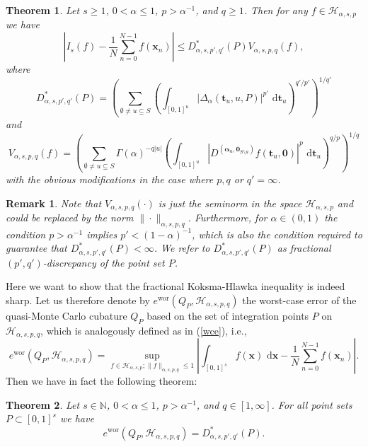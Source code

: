 \documentclass[12pt]{article}
\DeclareMathOperator{\wor}{wor}
\newtheorem{theorem}{Theorem}
\newtheorem{remark}{Remark}
\newcommand{\bsx}{\boldsymbol{x}}
\newcommand{\bst}{\boldsymbol{t}}
\newcommand{\bsalpha}{\boldsymbol{\alpha}}
\newcommand{\bszero}{\boldsymbol{0}}
\newcommand{\rd}{\,\mathrm{d}}
\newcommand{\NN}{\mathbb{N}}
\newcommand{\HH}{\mathcal{H}}
\begin{document}
\begin{theorem}\label{th_fracKH}
Let $s \ge 1$, $0 < \alpha \le 1$, $p > \alpha^{-1}$, and $q \ge 1$.
Then for any $f \in
\HH_{\alpha,s,p}$ we have
\begin{equation*}%
\left|I_s(f) - \frac{1}{N}
\sum_{n=0}^{N-1} f(\bsx_n) \right|  \le  D^\ast_{\alpha,s,p',q'}(P)
V_{\alpha,s,p,q}(f),
\end{equation*}
where
\begin{equation*}
D^\ast_{\alpha,s,p',q'}(P) = \left(\sum_{\emptyset \neq u \subseteq S}
 \left(\int_{[0,1]^{u}}
|\Delta_\alpha(\bst_u,u,P)|^{p'} \,\rd\bst_u \right)^{q'/p'}
\right)^{1/q'}
\end{equation*}
and
\begin{equation*}
V_{\alpha,s,p,q}(f) =\left(\sum_{\emptyset \neq u \subseteq S} 
\Gamma(\alpha)^{-q|u|}
\left(\int_{[0,1]^{u}} \left| D^{(\bsalpha_u, \bszero_{S\setminus u})}f(\bst_u, \bszero)\right|^{p} \,\rd\bst_u
\right)^{q/p} \right)^{1/q}
\end{equation*}
with the obvious modifications in the case where $p,q$ or $q'=\infty$.
\end{theorem}


\begin{remark}
Note that
$V_{\alpha,s,p,q}(\cdot)$ is just the seminorm in the space
$\HH_{\alpha,s,p}$ and could be replaced by the norm
$\|\cdot\|_{\alpha,s,p,q}$.
Furthermore, for $\alpha\in (0,1)$ the condition $p > \alpha^{-1}$ implies $p' < (1-\alpha)^{-1}$, which
is also the condition required to guarantee that
$D^\ast_{\alpha,s,p',q'}(P) < \infty$. 
We refer to $D^\ast_{\alpha,s,p',q'}(P)$ as \emph{fractional $(p', q')$-discrepancy} 
of the point set $P$.
\end{remark}


Here we want to show that the fractional Koksma-Hlawka inequality is indeed
sharp. Let us therefore denote by $e^{\wor}(Q_P,\HH_{\alpha,s,p,q})$ the
worst-case error
of the quasi-Monte Carlo cubature $Q_P$ based on the set of
integration points $P$ on $\HH_{\alpha,s,p,q}$, which is analogously defined as in (\ref{wce}), i.e.,
\begin{equation*}
e^{\wor}(Q_P,\HH_{\alpha,s,p,q}) = \sup_{f\in \HH_{\alpha,s,p}; \|f\|_{\alpha,s,p,q}\le 1} \left| \int_{[0,1]^s} f(\bsx) \, \rd \bsx
- \frac{1}{N} \sum_{n=0}^{N-1} f(\bsx_n) \right|.
\end{equation*}
Then we have in fact the following theorem:

\begin{theorem}
\label{KoksmaHlawka}
Let $s\in\NN$, $0<\alpha\le 1$, $p>\alpha^{-1}$, and $q\in [1,\infty]$.
For all point sets $P\subset [0,1]^s$ we have
\begin{equation}
\label{koksmahlawka}
e^{\wor}(Q_P,\HH_{\alpha,s,p,q}) =  D^\ast_{\alpha,s,p',q'}(P).
\end{equation}
\end{theorem}
\end{document}
